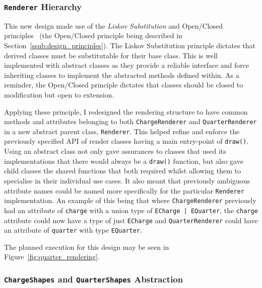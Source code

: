 \documentclass[nobib, a4paper, twoside, justified]{tufte-book}
\begin{document}
\subsubsection{\texttt{Renderer} Hierarchy}%
\label{ssub:renderer_hierarchy}

This new design made use of the \textit{Liskov Substitution} and Open/Closed
principles~\autocite{martin2000design} (the Open/Closed principle being described in
Section~\ref{ssub:design_principles}). The Liskov Substitution principle dictates that derived
classes must be substitutable for their base class. This is well implemented with abstract classes
as they provide a reliable interface and force inheriting classes to implement the abstracted
methods defined within. As a reminder, the Open/Closed principle dictates that classes should be
closed to modification but open to extension.

Applying these principle, I redesigned the rendering structure to have common methods and
attributes belonging to both \texttt{ChargeRenderer} and \texttt{QuarterRenderer} in a new abstract
parent class, \texttt{Renderer}. This helped refine and enforce the previously specified API of
render classes having a main entry-point of \texttt{draw()}. Using an abstract class not only gave
assurances to classes that used its implementations that there would always be a \texttt{draw()}
function, but also gave child classes the shared functions that both required whilst allowing them
to specialise in their individual use cases. It also meant that previously ambiguous attribute
names could be named more specifically for the particular \texttt{Renderer} implementation. An
example of this being that where \texttt{ChargeRenderer} previously had an attribute of
\texttt{charge} with a union type of \texttt{ECharge | EQuarter}, the \texttt{charge} attribute
could now have a type of just \texttt{ECharge} and \texttt{QuarterRenderer} could have an attribute
of \texttt{quarter} with type \texttt{EQuarter}.

The planned execution for this design may be seen in Figure~\ref{fig:quarter_rendering}.

\subsubsection{\texttt{ChargeShapes} and \texttt{QuarterShapes} Abstraction}%
\label{ssub:chargeshape_and_quartershape_abstraction}
\end{document}
